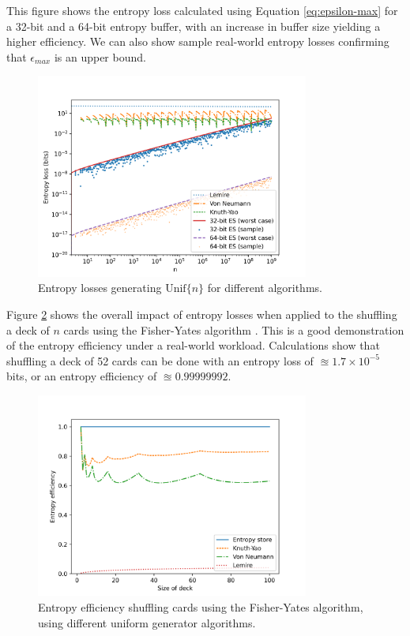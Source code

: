 \documentclass[lettersize,onecolumn]{IEEEtran}
\newcommand{\unif}[1]{\mathrm{Unif}\{#1\}}
\begin{document}
This figure shows the entropy loss calculated using Equation \ref{eq:epsilon-max} for a 32-bit and a 64-bit entropy buffer, with an increase in buffer size yielding a higher efficiency. We can also show sample real-world entropy losses confirming that $\epsilon_{max}$ is an upper bound.

\begin{figure}[ht]
\centering
\includegraphics[width=0.8\textwidth]{uniform_losses.png}
\caption{Entropy losses generating $\unif{n}$ for different algorithms.}
\label{fig:uniform-losses}
\end{figure}

Figure \ref{fig:shuffling-efficiency} shows the overall impact of entropy losses when applied to the shuffling a deck of $n$ cards using the Fisher-Yates algorithm \cite{fisher1953statistical, durstenfeld1964algorithm, knuth2014art}. This is a good demonstration of the entropy efficiency under a real-world workload. Calculations show that shuffling a deck of 52 cards can be done with an entropy loss of $\approxeq 1.7 \times 10^{-5}$ bits, or an entropy efficiency of $\approxeq 0.99999992$.

\begin{figure}[ht]
\centering
\includegraphics[width=0.8\textwidth]{shuffling_efficiency.png}
\caption{Entropy efficiency shuffling cards using the Fisher-Yates algorithm, using different uniform generator algorithms.}
\label{fig:shuffling-efficiency}
\end{figure}
\end{document}
